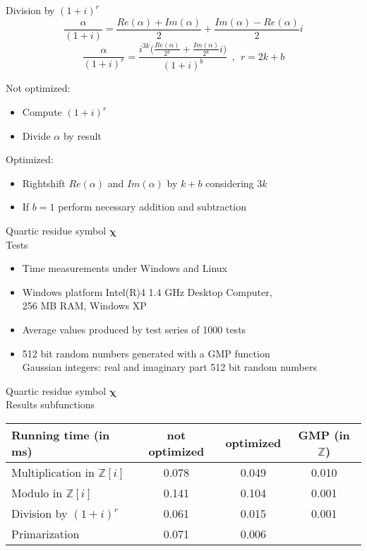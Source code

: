 \documentclass[a4, landscape, slidesonly]{seminar}
\renewcommand{\emph}[1]{{\color{emphcolor} #1}}
\newcommand{\slidetitle}[1]{{\large \color{titlecolor} #1}}
\begin{document}
\begin{slide}
\slidetitle{Division by $(1+i)^r$}
\\[.5cm]
 \[\frac{\alpha }{(1+i)} = \frac{Re(\alpha)+Im(\alpha)}{2} + \frac{Im(\alpha)- Re(\alpha)}{2} i\]
\[\frac{\alpha}{(1+i)^r} =  \frac{i^{3k} \Big(\frac{Re(\alpha)}{2{^k}} + \frac{Im(\alpha)}{2{^k}}i\Big) }{(1+i)^b}~~,~~r = 2k + b\]
\setlength{\columnseprule}{0pt}
\setlength{\columnsep}{.5cm}
\begin{multicols}{2}
Not optimized: 
\begin{itemize} 
\item Compute $(1+i)^r$ 
\item Divide $\alpha$ by result\\[.5cm]
 \end{itemize}
Optimized: 
\begin{itemize} 
\item Rightshift $Re(\alpha)$ and $Im(\alpha)$ by $k+b$ considering $3k$
\item If $b=1$ perform necessary addition and subtraction
 \end{itemize}
\end{multicols}
\end{slide}
\begin{slide}
\slidetitle{Quartic residue symbol $\mathbf{\chi}$}
\\[0.8cm]
\emph{Tests}
\begin{itemize}
\item Time measurements under Windows and Linux
\item Windows platform Intel(R)4 1.4 GHz Desktop Computer,\\ 256 MB RAM, Windows XP
\item Average values produced by test series of 1000 tests
\item 512 bit random numbers generated with a GMP function \\
Gaussian integers: real and imaginary part 512 bit random numbers 
\end{itemize}
\end{slide}
\begin{slide}
\slidetitle{Quartic residue symbol $\mathbf{\chi}$}
\\[0.8cm]
\emph{Results subfunctions}\\
 \begin{table}[htb] 
  \begin{tabular}{|l c c c|} 
 \hline 
  Running time (in ms)&  {not optimized} &  {optimized} & {GMP (in $\mathbb{Z}$)} \\ 
 \hline  
 Multiplication in $\mathbb{Z}[i]$ & 0.078  & 0.049 & 0.010\\
 Modulo in $\mathbb{Z}[i]$ &  0.141 & 0.104& 0.001\\ 
 Division by $(1+i)^r$  &  0.061 & 0.015 & 0.001\\ 
 Primarization &  0.071& 0.006 & \\ 
 \hline 
 \end{tabular}
 \end{table} 
 
\end{slide}
\end{document}
